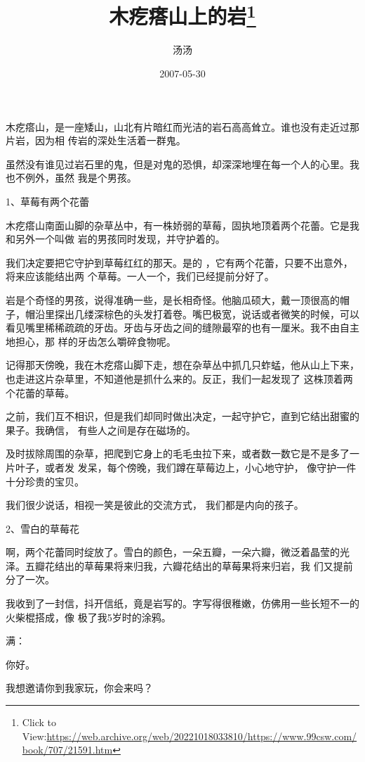 \documentclass{article}
\title{木疙瘩山上的岩\footnote{Click to View:\url{https://web.archive.org/web/20221018033810/https://www.99csw.com/book/707/21591.htm}}}
\author{汤汤}
\date{2007-05-30}
\begin{document}

\maketitle


\Large

﻿木疙瘩山，是一座矮山，山北有片暗红而光洁的岩石高高耸立。谁也没有走近过那片岩，因为相
传岩的深处生活着一群鬼。 

虽然没有谁见过岩石里的鬼，但是对鬼的恐惧，却深深地埋在每一个人的心里。我也不例外，虽然
我是个男孩。 


1、草莓有两个花蕾 

木疙瘩山南面山脚的杂草丛中，有一株娇弱的草莓，固执地顶着两个花蕾。它是我和另外一个叫做
岩的男孩同时发现，并守护着的。 

我们决定要把它守护到草莓红红的那天。是的
\newpage
，它有两个花蕾，只要不出意外，将来应该能结出两
个草莓。一人一个，我们已经提前分好了。 

岩是个奇怪的男孩，说得准确一些，是长相奇怪。他脑瓜硕大，戴一顶很高的帽子，帽沿里探出几缕深棕色的头发打着卷。嘴巴极宽，说话或者微笑的时候，可以看见嘴里稀稀疏疏的牙齿。牙齿与牙齿之间的缝隙最窄的也有一厘米。我不由自主地担心，那
样的牙齿怎么嚼碎食物呢。 

记得那天傍晚，我在木疙瘩山脚下走，想在杂草丛中抓几只蚱蜢，他从山上下来，也走进这片杂草里，不知道他是抓什么来的。反正，我们一起发现了
这株顶着两个花蕾的草莓。 

之前，我们互不相识，但是我们却同时做出决定，一起守护它，直到它结出甜蜜的果子。我确信，
有些人之间是存在磁场的。 

及时拔除周围的杂草，把爬到它身上的毛毛虫拉下来，或者数一数它是不是多了一片叶子，或者发
\newpage
发呆，每个傍晚，我们蹲在草莓边上，小心地守护，
像守护一件十分珍贵的宝贝。 

我们很少说话，相视一笑是彼此的交流方式，
我们都是内向的孩子。 


2、雪白的草莓花 

啊，两个花蕾同时绽放了。雪白的颜色，一朵五瓣，一朵六瓣，微泛着晶莹的光泽。五瓣花结出的草莓果将来归我，六瓣花结出的草莓果将来归岩，我
们又提前分了一次。 

我收到了一封信，抖开信纸，竟是岩写的。字写得很稚嫩，仿佛用一些长短不一的火柴棍搭成，像
极了我5岁时的涂鸦。 


满： 


你好。 

\newpage


我想邀请你到我家玩，你会来吗？ 
\end{document}
